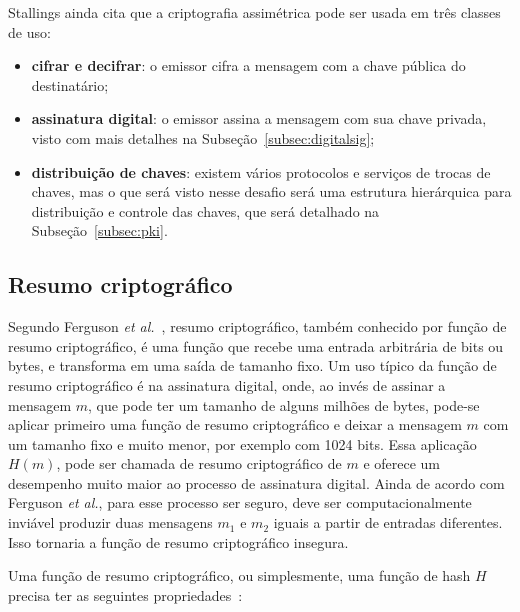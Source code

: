 \documentclass{article}
\begin{document}
Stallings ainda cita que a criptografia assimétrica pode ser usada em três
classes de uso:

\begin{itemize}
  \item \textbf{cifrar e decifrar}: o emissor cifra a mensagem com a chave
      pública do destinatário;
  \item \textbf{assinatura digital}: o emissor assina a mensagem com sua chave
      privada, visto com mais detalhes na Subseção~\ref{subsec:digitalsig};
  \item \textbf{distribuição de chaves}: existem vários protocolos e serviços
      de trocas de chaves, mas o que será visto nesse desafio será uma
        estrutura hierárquica para distribuição e controle das chaves, que será
        detalhado na Subseção~\ref{subsec:pki}.
\end{itemize}

\subsection{Resumo criptográfico}\label{subsec:hash}

Segundo Ferguson \textit{et al.}~\cite{Ferguson:book:2011}, resumo
criptográfico, também conhecido por função de resumo criptográfico, é uma
função que recebe uma entrada arbitrária de bits ou bytes, e transforma em uma
saída de tamanho fixo. Um uso típico da função de resumo criptográfico é na
assinatura digital, onde, ao invés de assinar a mensagem $m$, que pode ter um
tamanho de alguns milhões de bytes, pode-se aplicar primeiro uma função de
resumo criptográfico e deixar a mensagem $m$ com um tamanho fixo e muito menor,
por exemplo com 1024 bits. Essa aplicação $H(m)$, pode ser chamada de resumo
criptográfico de $m$ e oferece um desempenho muito maior ao processo de
assinatura digital. Ainda de acordo com Ferguson \textit{et al.}, para esse
processo ser seguro, deve ser computacionalmente inviável produzir duas
mensagens $m_1$ e $m_2$ iguais a partir de entradas diferentes. Isso tornaria a
função de resumo criptográfico insegura.

Uma função de resumo criptográfico, ou simplesmente, uma função de hash $H$
precisa ter as seguintes propriedades~\cite{Stallings:book:2016}:
\end{document}
